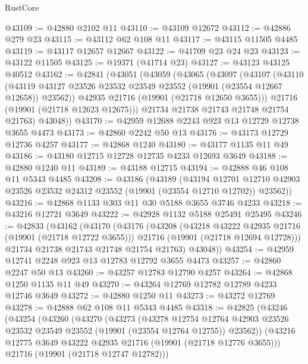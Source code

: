 \begin{lexlean}{RustCore}
\begin{coremodule}
@43109 := @42880 @2102 @11
@43110 := @43109 @12672
@43112 := @42886 @279 @23
@43115 := @43112 @62 @108 @11
@43117 := @43115 @11505 @4485
@43119 := @43117 @12657 @12667
@43122 := @41709 @23 @24 @23
@43123 := @43122 @11505
@43125 := @19371 (@41714 @23)
@43127 := @43123 @43125 @40512
@43162 := @42841
    (@43051
      (@43059
        (@43065
          (@43097
            (@43107
              (@43110
                (@43119 @43127 @23526 @23532 @23549 @23552 (@19901 (@23554 @12667 @12658)) @23562))
              @42935
              @21716
              (@19901 (@21718 @12650 @3655)))
            @21716
            (@19901 (@21718 @12623 @12675)))
          @21734
          @21738
          @21743
          @21748
          @21754
          @21763)
        @43048))
@43170 := @42959 @12688 @2243 @923 @13 @12729 @12738 @3655 @4473
@43173 := @42860 @2242 @50 @13
@43176 := @43173 @12729 @12736 @4257
@43177 := @42868 @1240
@43180 := @43177 @1135 @11 @49
@43186 := @43180 @12715 @12728 @12735 @4233 @12693 @3649
@43188 := @42880 @1240 @11
@43189 := @43188 @12715
@43194 := @42888 @46 @108 @11 @5343 @4485
@43208 := @43186
    (@43189
      (@43194
        @12701
        @12710
        @42903
        @23526
        @23532
        @24312
        @23552
        (@19901 (@23554 @12710 @12702))
        @23562))
@43216 := @42868 @1133 @303 @11 @30 @5188 @3655 @3746 @4233
@43218 := @43216 @12721 @3649
@43222 := @42928 @1132 @5188 @25491 @25495
@43246 := @42833
    (@43162
      (@43170
        (@43176
          (@43208
            (@43218 @43222 @42935 @21716 (@19901 (@21718 @12722 @3655)))
            @21716
            (@19901 (@21718 @12694 @12728)))
          @21734
          @21738
          @21743
          @21748
          @21754
          @21763)
        @43048))
@43254 := @42959 @12741 @2248 @923 @13 @12783 @12792 @3655 @4473
@43257 := @42860 @2247 @50 @13
@43260 := @43257 @12783 @12790 @4257
@43264 := @42868 @1250 @1135 @11 @49
@43270 := @43264 @12769 @12782 @12789 @4233 @12746 @3649
@43272 := @42880 @1250 @11
@43273 := @43272 @12769
@43278 := @42888 @62 @108 @11 @5343 @4485
@43318 := @42825
    (@43246
      (@43254
        (@43260
          (@43270
            (@43273
              (@43278
                @12754
                @12764
                @42903
                @23526
                @23532
                @23549
                @23552
                (@19901 (@23554 @12764 @12755))
                @23562))
            (@43216 @12775 @3649 @43222 @42935 @21716 (@19901 (@21718 @12776 @3655)))
            @21716
            (@19901 (@21718 @12747 @12782)))

\end{coremodule}
\end{lexlean}
